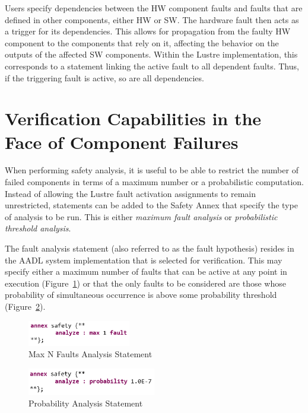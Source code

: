 Users specify dependencies between the HW component faults and faults that are defined in other components, either HW or SW. The hardware fault then acts as a trigger for its dependencies. This allows for propagation from the faulty HW component to the components that rely on it, affecting the behavior on the outputs of the affected SW components. Within the Lustre implementation, this corresponds to a statement linking the active fault to all dependent faults. Thus, if the triggering fault is active, so are all dependencies.

\section{Verification Capabilities in the Face of Component Failures}
When performing safety analysis, it is useful to be able to restrict the number of failed components in terms of a maximum number or a probabilistic computation. Instead of allowing the Lustre fault activation assignments to remain unrestricted, statements can be added to the Safety Annex that specify the type of analysis to be run. This is either \textit{maximum fault analysis} or \textit{probabilistic threshold analysis}. 

The fault analysis statement (also referred to as the fault hypothesis) resides in the AADL system implementation that is selected for verification. This may specify either a maximum number of faults that can be active at any point in execution (Figure~\ref{fig:hypothesisMaxN}) or that the only faults to be considered are those whose probability of simultaneous occurrence is above some probability threshold (Figure~\ref{fig:hypothesisProb}).

\begin{figure}[h!]
	\vspace{-0.1in}
	\begin{center}
		\includegraphics[width=0.4\textwidth]{images/hypothesisMaxN.png}
	\end{center}
	\vspace{-0.1in}
	\caption{Max N Faults Analysis Statement}
	\label{fig:hypothesisMaxN}
\end{figure} 

\begin{figure}[h!]
	\vspace{-0.1in}
	\begin{center}
		\includegraphics[width=0.5\textwidth]{images/hypothesisProb.png}
	\end{center}
	\vspace{-0.1in}
	\caption{Probability Analysis Statement}
	\label{fig:hypothesisProb}
\end{figure}

